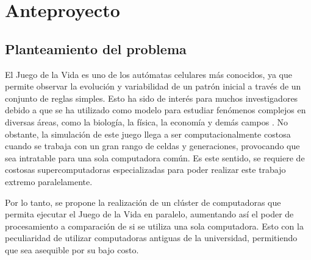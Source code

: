 
\chapter{Anteproyecto}
\label{chapter:intro}

\section{Planteamiento del problema}
\label{section:planteamiento}

El Juego de la Vida es uno de los autómatas celulares más conocidos, ya que permite observar la evolución y variabilidad de un patrón inicial a través de un conjunto de reglas simples. Esto ha sido de interés para muchos investigadores debido a que se ha utilizado como modelo para estudiar fenómenos complejos en diversas áreas, como la biología, la física, la economía y demás campos \cite{argun2021simulation}\cite{adamatzky2010game}. No obstante, la simulación de este juego llega a ser computacionalmente costosa cuando se trabaja con un gran rango de celdas y generaciones, provocando que sea intratable para una sola computadora común. Es este sentido, se requiere de costosas supercomputadoras especializadas para poder realizar este trabajo extremo paralelamente.

Por lo tanto, se propone la realización de un clúster de computadoras que permita ejecutar el Juego de la Vida en paralelo, aumentando así el poder de procesamiento a comparación de si se utiliza una sola computadora. Esto con la peculiaridad de utilizar computadoras antiguas de la universidad, permitiendo que sea asequible por su bajo costo.